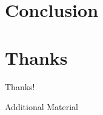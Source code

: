 \documentclass[hyperref={pdfpagelabels=false}]{beamer}
\begin{document}
\section{Conclusion}

\section*{Thanks}
\begin{frame}
    \begin{center}
        Thanks!
    \end{center}
\end{frame}
\appendix
{}
\setcounter{finalframe}{\value{framenumber}}

\begin{frame}
\end{frame}

\begin{frame}
    Additional Material
\end{frame}
\setcounter{framenumber}{\value{finalframe}}
\end{document}

